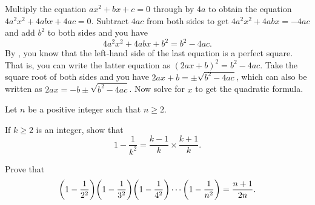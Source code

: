 \documentclass[a4paper,oneside,12pt]{article}
\begin{document}
\begin{problem}
{\begin{solution}
Multiply the equation $ax^2 + bx + c = 0$ through by $4a$ to obtain
the equation $4a^2x^2 + 4abx + 4ac = 0$.  Subtract $4ac$ from both
sides to get $4a^2x^2 + 4abx = -4ac$ and add $b^2$ to both sides and
you have
\[
4a^2x^2 + 4abx + b^2
=
b^2 - 4ac.
\]
By , you
know that the left-hand side of the last equation is a perfect
square.  That is, you can write the latter equation as
$(2ax + b)^2 = b^2 - 4ac$.  Take the square root of both sides and you
have $2ax + b = \pm \sqrt{b^2 - 4ac}$, which can also be written as
$2ax = -b \pm \sqrt{b^2 - 4ac}$.  Now solve for $x$ to get the
quadratic formula.
\end{solution}
}{}

\item Let $n$ be a positive integer such that $n \geq 2$.
  \begin{packedenum}
  \item\label{subprob:difference_two_squares_reciprocal_product_k}
    If $k \geq 2$ is an integer, show that
    \[
    1 - \frac{1}{k^2}
    =
    \frac{k - 1}{k}
    \times
    \frac{k + 1}{k}.
    \]

  \item\label{subprob:difference_two_squares_reciprocal_products}
    Prove that
    \[
    \productseq{
      \parenthesis*{1 - \frac{1}{2^2}}
      \parenthesis*{1 - \frac{1}{3^2}}
    }{
      \parenthesis*{1 - \frac{1}{4^2}}
    }{
      \parenthesis*{1 - \frac{1}{n^2}}
    }
    =
    \frac{n + 1}{2n}.
    \]
  \end{packedenum}
\end{problem}
\end{document}
